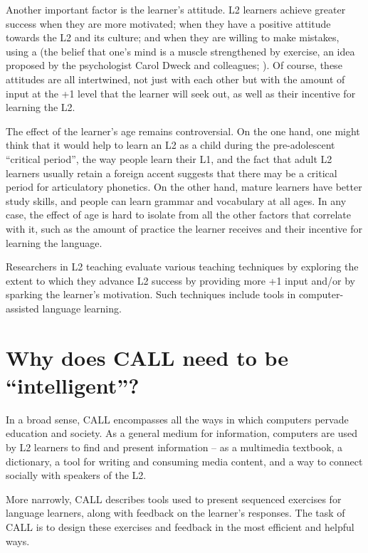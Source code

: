 Another important factor is the learner's attitude.  L2 learners
achieve greater success when they are more motivated; when they have a
positive attitude towards the L2 and its culture; and when they are
willing to make mistakes, using a  (the belief
that one's mind is a muscle strengthened by exercise, an idea proposed
by the psychologist Carol Dweck and colleagues;
\citealt{BlackwellDweck-etal:2007}).  Of course, these attitudes are
all intertwined, not just with each other but with the amount of input
at the +1 level that the learner will seek out, as well as
their incentive for learning the L2.

The effect of the learner's age remains controversial.  On the one
hand, one might think that it would help to learn an L2 as a child
during the pre-adolescent ``critical period'', the way people learn
their L1, and the fact that adult L2 learners usually retain a foreign
accent suggests that there may be a critical period for articulatory
phonetics.  On the other hand, mature learners have better study
skills, and people can learn grammar and vocabulary at all ages.  In
any case, the effect of age is hard to isolate from all the other
factors that correlate with it, such as the amount of practice the
learner receives and their incentive for learning the language.

Researchers in L2 teaching evaluate various teaching techniques by exploring the
extent to which they advance L2 success by providing more +1
input and/or by sparking the learner's motivation.    Such techniques include tools in computer-assisted language learning. 

\section{Why does CALL need to be ``intelligent''?}

In a broad sense, CALL encompasses all the ways in which computers pervade education and society.  As a general medium for information, computers are used by L2 learners to find and present information -- as a multimedia textbook, a dictionary, a tool for writing and consuming media
content, and a way to connect socially with speakers of the L2.  

More narrowly, CALL describes tools used to present sequenced exercises for language learners, along with feedback on the learner's responses.  The task of CALL is to design these exercises and feedback in the most efficient and helpful ways.


